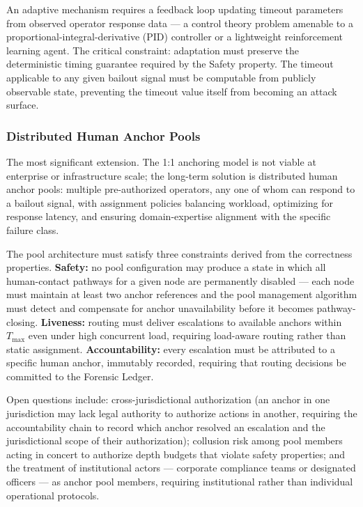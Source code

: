 An adaptive mechanism requires a feedback loop updating timeout parameters from observed operator response data --- a control theory problem amenable to a proportional-integral-derivative (PID) controller or a lightweight reinforcement learning agent. The critical constraint: adaptation must preserve the deterministic timing guarantee required by the Safety property. The timeout applicable to any given bailout signal must be computable from publicly observable state, preventing the timeout value itself from becoming an attack surface.

\subsubsection{Distributed Human Anchor Pools}
\label{sec:future-anchor-pools}

The most significant extension. The 1:1 anchoring model is not viable at enterprise or infrastructure scale; the long-term solution is distributed human anchor pools: multiple pre-authorized operators, any one of whom can respond to a bailout signal, with assignment policies balancing workload, optimizing for response latency, and ensuring domain-expertise alignment with the specific failure class.

The pool architecture must satisfy three constraints derived from the correctness properties. \textbf{Safety:} no pool configuration may produce a state in which all human-contact pathways for a given node are permanently disabled --- each node must maintain at least two anchor references and the pool management algorithm must detect and compensate for anchor unavailability before it becomes pathway-closing. \textbf{Liveness:} routing must deliver escalations to available anchors within $T_{\max}$ even under high concurrent load, requiring load-aware routing rather than static assignment. \textbf{Accountability:} every escalation must be attributed to a specific human anchor, immutably recorded, requiring that routing decisions be committed to the Forensic Ledger.

Open questions include: cross-jurisdictional authorization (an anchor in one jurisdiction may lack legal authority to authorize actions in another, requiring the accountability chain to record which anchor resolved an escalation and the jurisdictional scope of their authorization); collusion risk among pool members acting in concert to authorize depth budgets that violate safety properties; and the treatment of institutional actors --- corporate compliance teams or designated officers --- as anchor pool members, requiring institutional rather than individual operational protocols.

